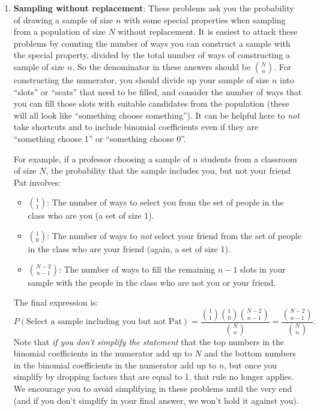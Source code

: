 \documentclass[11pt]{article}
\begin{document}
\begin{enumerate}
\item {\bf Sampling without replacement}: These problems ask you the probability of drawing a sample of size $n$ with some special properties when sampling from a population of size $N$ without replacement. It is easiest to attack these problems by counting the number of ways you can construct a sample with the special property, divided by the total number of ways of constructing a sample of size $n$. So the denominator in these answers should be ${N \choose n}$. For constructing the numerator, you should divide up your sample of size $n$ into ``slots'' or ``seats'' that need to be filled, and consider the number of ways that you can fill those slots with suitable candidates from the population (these will all look like ``something choose something''). It can be helpful here to \emph{not} take shortcuts and to include binomial coefficients even if they are ``something choose 1'' or ``something choose 0''.

For example, if a professor choosing a sample of $n$ students from a classroom of size $N$, the probability that the sample includes you, but not your friend Pat involves:
\begin{itemize}
\item ${1 \choose 1}$: The number of ways to select you from the set of people in the class who are you (a set of size 1).
\item ${1 \choose 0}$: The number of ways to \emph{not} select your friend from the set of people in the class who are your friend (again, a set of size 1).
\item ${N-2 \choose n-1}$: The number of ways to fill the remaining $n-1$ slots in your sample with the people in the class who are not you or your friend.
\end{itemize}
The final expression is:
$$
P(\textrm{Select a sample including you but not Pat}) = \frac{{1\choose 1}{1\choose 0}{N-2 \choose n-1}}{{N \choose n}} = \frac{{N-2 \choose n-1}}{{N \choose n}}.
$$
Note that \emph{if you don't simplify the statement} that the top numbers in the binomial coefficients in the numerator add up to $N$ and the bottom numbers in the binomial coefficients in the numerator add up to $n$, but once you simplify by dropping factors that are equal to 1, that rule no longer applies. We encourage you to avoid simplifying in these problems until the very end (and if you don't simplify in your final answer, we won't hold it against you).
\end{enumerate}

\newpage
\end{document}
